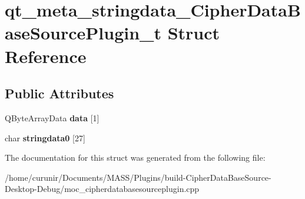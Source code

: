 \hypertarget{structqt__meta__stringdata___cipher_data_base_source_plugin__t}{}\section{qt\+\_\+meta\+\_\+stringdata\+\_\+\+Cipher\+Data\+Base\+Source\+Plugin\+\_\+t Struct Reference}
\label{structqt__meta__stringdata___cipher_data_base_source_plugin__t}
\subsection*{Public Attributes}
\begin{DoxyCompactItemize}
\item 
Q\+Byte\+Array\+Data {\bfseries data} \mbox{[}1\mbox{]}\hypertarget{structqt__meta__stringdata___cipher_data_base_source_plugin__t_a7ae6ba26e23c7fea5a488179d5a81387}{}\label{structqt__meta__stringdata___cipher_data_base_source_plugin__t_a7ae6ba26e23c7fea5a488179d5a81387}

\item 
char {\bfseries stringdata0} \mbox{[}27\mbox{]}\hypertarget{structqt__meta__stringdata___cipher_data_base_source_plugin__t_a8457ed4231588bc288606af704e393cc}{}\label{structqt__meta__stringdata___cipher_data_base_source_plugin__t_a8457ed4231588bc288606af704e393cc}

\end{DoxyCompactItemize}


The documentation for this struct was generated from the following file\+:\begin{DoxyCompactItemize}
\item 
/home/curunir/\+Documents/\+M\+A\+S\+S/\+Plugins/build-\/\+Cipher\+Data\+Base\+Source-\/\+Desktop-\/\+Debug/moc\+\_\+cipherdatabasesourceplugin.\+cpp\end{DoxyCompactItemize}
